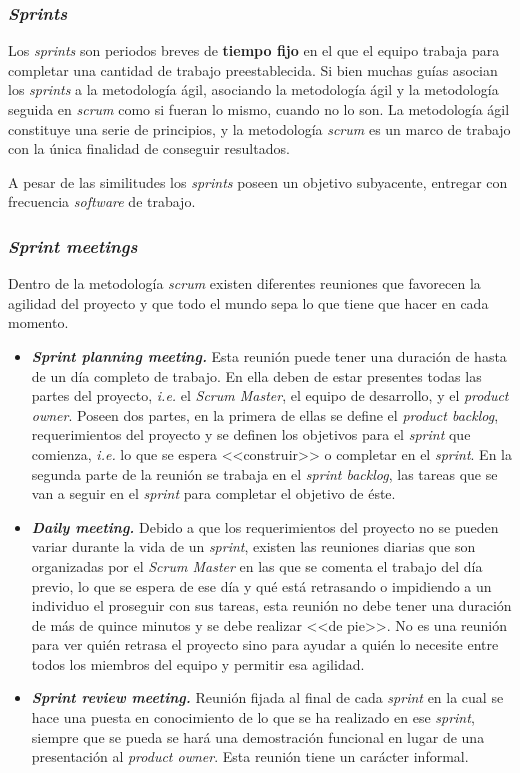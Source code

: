 \subsubsection{\textit{Sprints}}
Los \textit{sprints} son periodos breves de \textbf{tiempo fijo} en el que el equipo trabaja para completar una cantidad de trabajo preestablecida. Si bien muchas guías asocian los \textit{sprints} a la metodología ágil, asociando la metodología ágil y la metodología seguida en \textit{scrum} como si fueran lo mismo, cuando no lo son. La metodología ágil constituye una serie de principios, y la metodología \textit{scrum} es un marco de trabajo con la única finalidad de conseguir resultados.

A pesar de las similitudes los \textit{sprints} poseen un objetivo subyacente, entregar con frecuencia \textit{software} de trabajo.

\subsubsection{\textit{Sprint meetings}}
Dentro de la metodología \textit{scrum} existen diferentes reuniones que favorecen la agilidad del proyecto y que todo el mundo sepa lo que tiene que hacer en cada momento.
\begin{itemize}
\item \textbf{\textit{Sprint planning meeting.}} Esta reunión puede tener una duración de hasta de un día completo de trabajo. En ella deben de estar presentes todas las partes del proyecto, \textit{i.e.} el \textit{Scrum Master}, el equipo de desarrollo, y el \textit{product owner}. Poseen dos partes, en la primera de ellas se define el \textit{product backlog}, requerimientos del proyecto y se definen los objetivos para el \textit{sprint} que comienza, \textit{i.e.} lo que se espera <<construir>> o completar en el \textit{sprint}. En la segunda parte de la reunión se trabaja en el \textit{sprint backlog}, las tareas que se van a seguir en el \textit{sprint} para completar el objetivo de éste.
\item \textbf{\textit{Daily meeting.}} Debido a que los requerimientos del proyecto no se pueden variar durante la vida de un \textit{sprint}, existen las reuniones diarias que son organizadas por el \textit{Scrum Master} en las que se comenta el trabajo del día previo, lo que se espera de ese día y qué está retrasando o impidiendo a un individuo el proseguir con sus tareas, esta reunión no debe tener una duración de más de quince minutos y se debe realizar <<de pie>>. No es una reunión para ver quién retrasa el proyecto sino para ayudar a quién lo necesite entre todos los miembros del equipo y permitir esa agilidad.
\item \textbf{\textit{Sprint review meeting.}} Reunión fijada al final de cada \textit{sprint} en la cual se hace una puesta en conocimiento de lo que se ha realizado en ese \textit{sprint}, siempre que se pueda se hará una demostración funcional en lugar de una presentación al \textit{product owner}. Esta reunión tiene un carácter informal.
\end{itemize}
 
